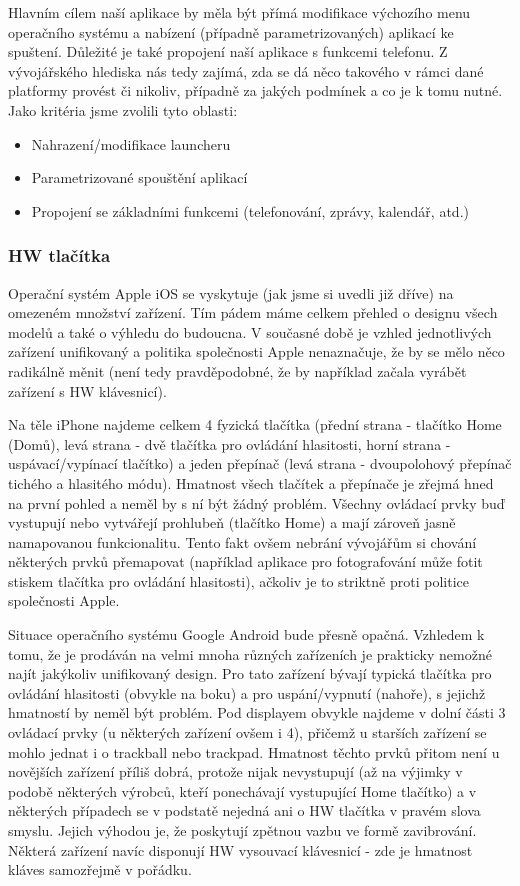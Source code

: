 \documentclass[thesis=M,czech]{FITthesis}[2012/06/26]
\begin{document}
Hlavním cílem naší aplikace by měla být přímá modifikace výchozího menu operačního systému a nabízení (případně parametrizovaných) aplikací ke spuštení. Důležité je také propojení naší aplikace s funkcemi telefonu. Z vývojářského hlediska nás tedy zajímá, zda se dá něco takového v rámci dané platformy provést či nikoliv, případně za jakých podmínek a co je k tomu nutné. Jako kritéria jsme zvolili tyto oblasti:

\begin{itemize}
\item    Nahrazení/modifikace launcheru
\item    Parametrizované spouštění aplikací
\item    Propojení se základními funkcemi (telefonování, zprávy, kalendář, atd.)
\end{itemize}

\subsubsection{HW tlačítka}
Operační systém Apple iOS se vyskytuje (jak jsme si uvedli již dříve) na omezeném množství zařízení. Tím pádem máme celkem přehled o designu všech modelů a také o výhledu do budoucna. V současné době je vzhled jednotlivých zařízení unifikovaný a politika společnosti Apple nenaznačuje, že by se mělo něco radikálně měnit (není tedy pravděpodobné, že by například začala vyrábět zařízení s HW klávesnicí).

Na těle iPhone najdeme celkem 4 fyzická tlačítka (přední strana - tlačítko Home (Domů), levá strana - dvě tlačítka pro ovládání hlasitosti, horní strana - uspávací/vypínací tlačítko) a jeden přepínač (levá strana - dvoupolohový přepínač tichého a hlasitého módu)\cite{iphone}. Hmatnost všech tlačítek a přepínače je zřejmá hned na první pohled a neměl by s ní být žádný problém. Všechny ovládací prvky buď vystupují nebo vytvářejí prohlubeň (tlačítko Home) a mají zároveň jasně namapovanou funkcionalitu\cite{iphone_anatomy}. Tento fakt ovšem nebrání vývojářům si chování některých prvků přemapovat (například aplikace pro fotografování může fotit stiskem tlačítka pro ovládání hlasitosti), ačkoliv je to striktně proti politice společnosti Apple.

Situace operačního systému Google Android bude přesně opačná. Vzhledem k tomu, že je prodáván na velmi mnoha různých zařízeních je prakticky nemožné najít jakýkoliv unifikovaný design. Pro tato zařízení bývají typická tlačítka pro ovládání hlasitosti (obvykle na boku) a pro uspání/vypnutí (nahoře), s jejichž hmatností by neměl být problém. Pod displayem obvykle najdeme v dolní části 3 ovládací prvky (u některých zařízení ovšem i 4), přičemž u starších zařízení se mohlo jednat i o trackball nebo trackpad. Hmatnost těchto prvků přitom není u novějších zařízení příliš dobrá, protože nijak nevystupují (až na výjimky v podobě některých výrobců, kteří ponechávají vystupující Home tlačítko) a v některých případech se v podstatě nejedná ani o HW tlačítka v pravém slova smyslu. Jejich výhodou je, že poskytují zpětnou vazbu ve formě zavibrování. Některá zařízení navíc disponují HW vysouvací klávesnicí - zde je hmatnost kláves samozřejmě v pořádku.
\end{document}
